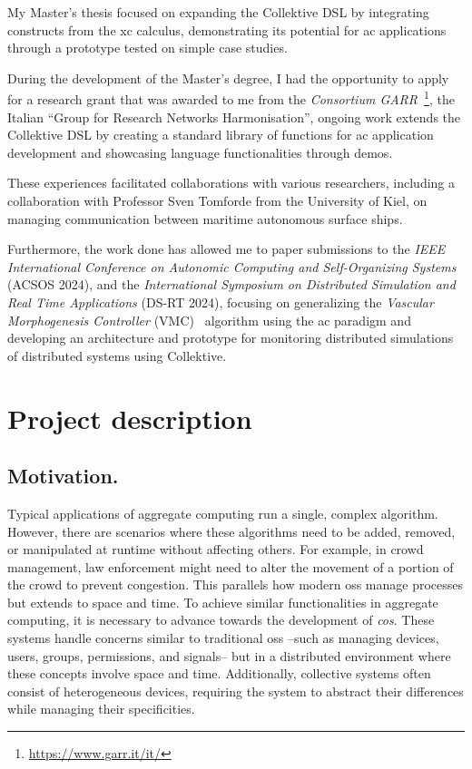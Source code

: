 \documentclass[12pt, a4paper]{article}
\begin{document}
My Master’s thesis focused on expanding the Collektive DSL by integrating constructs from the \ac{xc} calculus,
demonstrating its potential for \ac{ac} applications through a prototype tested on simple case studies.

During the development of the Master's degree,
I had the opportunity to apply for a research grant that was awarded to me from the \emph{Consortium GARR}~\footnote{\url{https://www.garr.it/it/}},
the Italian ``Group for Research Networks Harmonisation'',
ongoing work extends the Collektive DSL by creating a standard library of functions for \ac{ac} application development and showcasing language functionalities through demos.

These experiences facilitated collaborations with various researchers, including a collaboration with Professor Sven Tomforde from
the University of Kiel,
on managing communication between maritime autonomous surface ships.

Furthermore,
the work done has allowed me to paper submissions to the \emph{IEEE International Conference on Autonomic Computing and Self-Organizing Systems} (ACSOS 2024),
and the \emph{International Symposium on Distributed Simulation and Real Time Applications} (DS-RT 2024),
focusing on generalizing the \emph{Vascular Morphogenesis Controller} (VMC)~\cite{ZahadatHS17} algorithm using the \ac{ac} paradigm
and developing an architecture and prototype for monitoring distributed simulations of distributed systems using Collektive.

\section{Project description}
\label{sec:project-description}

\subsection{Motivation.}
\label{subsec:motivation.}

Typical applications of aggregate computing run a single, complex algorithm.
%
However,
there are scenarios where these algorithms need to be added, removed,
or manipulated at runtime without affecting others.
%
For example, in crowd management,
law enforcement might need to alter the movement of a portion of the crowd to prevent congestion.
%
This parallels how modern \acp{os} manage processes but extends to space and time.
%
To achieve similar functionalities in aggregate computing,
it is necessary to advance towards the development of \emph{\ac{cos}}.
%
These systems handle concerns similar to traditional \acp{os} --such as managing devices, users, groups, permissions, and signals--
but in a distributed environment where these concepts involve space and time.
%
Additionally,
collective systems often consist of heterogeneous devices,
requiring the system to abstract their differences while managing their specificities.
\end{document}
